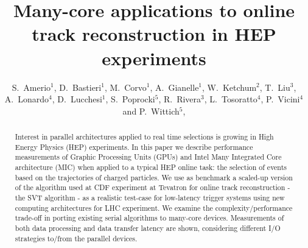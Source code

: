 \documentclass[a4]{jpconf}
\begin{document}
\title{Many-core applications to online track reconstruction in HEP experiments}
\author{S.~Amerio$^1$, 
  D.~Bastieri$^1$, 
  M.~Corvo$^1$, 
  A.~Gianelle$^1$, 
  W.~Ketchum$^2$,
  T.~Liu$^3$, 
  A.~Lonardo$^4$, 
  D.~Lucchesi$^1$,
  S.~Poprocki$^5$, 
  R.~Rivera$^3$, 
  L.~Tosoratto$^4$,
  P.~Vicini$^4$
  and 
  P.~Wittich$^5$,
}
\address{$^1$ INFN and University of Padova, Padova, Italy}
\address{$^2$ Los Alamos National Laboratory, Los Alamos, New Mexico, USA}
\address{$^3$ Fermi National Accelerator Laboratory, Batavia, Illinois, USA}
\address{$^4$ INFN Roma, Rome, Italy}
\address{$^5$ Cornell University, Ithaca, New York, USA}


\begin{abstract}
  Interest in parallel architectures applied to real time selections is 
  growing in High Energy Physics (HEP) experiments. In this paper we describe
  performance measurements of Graphic Processing Units (GPUs) and Intel Many
  Integrated Core architecture (MIC) when applied to a typical HEP online task: 
  the selection of events based on the trajectories of charged particles.
  We use as benchmark a scaled-up version of the algorithm used at CDF 
  experiment at Tevatron for online track reconstruction - the SVT algorithm - 
as a realistic  test-case for low-latency trigger systems using new computing
  architectures for LHC experiment. We examine the
  complexity/performance trade-off in porting existing serial
  algorithms to many-core devices. Measurements of both data processing 
  and data transfer latency are shown, considering different I/O strategies 
  to/from the parallel devices. 
\end{abstract}
\end{document}
